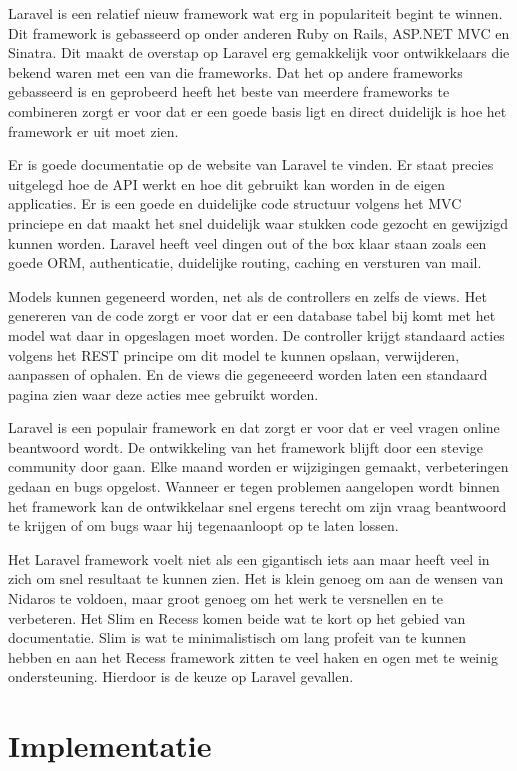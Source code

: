\documentclass[a4paper,11pt,oneside]{report}
\begin{document}
Laravel is een relatief nieuw framework wat erg in populariteit begint te winnen. Dit framework is gebasseerd op onder anderen Ruby on Rails, ASP.NET MVC en Sinatra. Dit maakt de overstap op Laravel erg gemakkelijk voor ontwikkelaars die bekend waren met een van die frameworks. Dat het op andere frameworks gebasseerd is en geprobeerd heeft het beste van meerdere frameworks te combineren zorgt er voor dat er een goede basis ligt en direct duidelijk is hoe het framework er uit moet zien. 


Er is goede documentatie op de website van Laravel te vinden. Er staat precies uitgelegd hoe de API werkt en hoe dit gebruikt kan worden in de eigen applicaties. Er is een goede en duidelijke code structuur volgens het MVC princiepe en dat maakt het snel duidelijk waar stukken code gezocht en gewijzigd kunnen worden. Laravel heeft veel dingen out of the box klaar staan zoals een goede ORM, authenticatie, duidelijke routing, caching en versturen van mail. 

Models kunnen gegeneerd worden, net als de controllers en zelfs de views. Het genereren van de code zorgt er voor dat er een database tabel bij komt met het model wat daar in opgeslagen moet worden. De controller krijgt standaard acties volgens het REST principe om dit model te kunnen opslaan, verwijderen, aanpassen of ophalen. En de views die gegeneeerd worden laten een standaard pagina zien waar deze acties mee gebruikt worden. 

Laravel is een populair framework en dat zorgt er voor dat er veel vragen online beantwoord wordt. De ontwikkeling van het framework blijft door een stevige community door gaan. Elke maand worden er wijzigingen gemaakt, verbeteringen gedaan en bugs opgelost. Wanneer er tegen problemen aangelopen wordt binnen het framework kan de ontwikkelaar snel ergens terecht om zijn vraag beantwoord te krijgen of om bugs waar hij tegenaanloopt op te laten lossen. 

Het Laravel framework voelt niet als een gigantisch iets aan maar heeft veel in zich om snel resultaat te kunnen zien. Het is klein genoeg om aan de wensen van Nidaros te voldoen, maar groot genoeg om het werk te versnellen en te verbeteren. Het Slim en Recess komen beide wat te kort op het gebied van documentatie. Slim is wat te minimalistisch om lang profeit van te kunnen hebben en aan het Recess framework zitten te veel haken en ogen met te weinig ondersteuning. Hierdoor is de keuze op Laravel gevallen.


\chapter{Implementatie}
\end{document}
